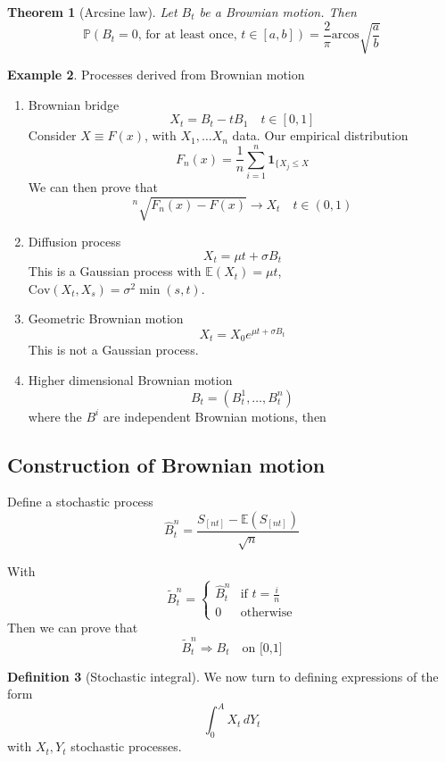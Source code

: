 \documentclass[10pt, oneside, reqno]{amsart}
\theoremstyle{plain}%
\newtheorem{thm}{Theorem}[section]
\theoremstyle{definition}
\newtheorem{defn}[thm]{Definition}
\newtheorem{exmp}[thm]{Example}
\theoremstyle{remark}
\renewcommand{\P}{\mathbb{P}}
\newcommand{\E}{\mathbb{E}}
\begin{document}
\begin{thm}[Arcsine law]
    Let $B_t$ be a Brownian motion.  Then \[
        \P(\text{$B_t = 0$, for at least once, $t \in [a,b]$}) = \frac{2}{\pi} \text{arcos} \sqrt{\frac{a}{b}}
    \]
\end{thm}

\begin{exmp}
    Processes derived from Brownian motion
    \begin{enumerate}[(1)]
        \item Brownian bridge
        \[
            X_t = B_t - t B_1 \quad t \in [0,1]
        \]
        Consider $X \equiv F(x)$, with $X_1, \dots X_n$ data.  Our empirical distribution \[
            F_n(x) = \frac{1}{n} \sum_{i=1}^n \mathbf{1}_{\{ X_j \leq X}
        \]
        We can then prove that \[
        {}^n\sqrt{F_n(x) - F(x)} \rightarrow X_t \quad t \in (0,1)
        \] 
        \item Diffusion process\[
            X_t = \mu t + \sigma B_t
        \] This is a Gaussian process with $\E(X_t) = \mu t$, $\text{Cov}(X_t, X_s) = \sigma^2 \min(s,t)$.
        \item Geometric Brownian motion\[
            X_t = X_0 e^{\mu t + \sigma B_t}
        \] This is not a Gaussian process.
        \item Higher dimensional Brownian motion\[
            B_t = ( B^1_t, \dots, B^n_t)
        \] where the $B^{i}$ are independent Brownian motions, then 

    \end{enumerate}
\end{exmp}
    
\subsection{Construction of Brownian motion} %
\label{sub:construction_of_brownian_motion}
Define a stochastic process \[
    \hat B_t^n = \frac{ S_{[nt]} - \E(S_{[nt]})}{\sqrt{n}}
\]

With \[
    \tilde B_t^n = \begin{cases}
        \hat B_t^n &\text{if $t = \frac{i}{n}$} \\
        0           &\text{otherwise}
    \end{cases}
\]
Then we can prove that \[
    \tilde B_t^n \Rightarrow B_t \quad \text{on [0,1]}
\]

\begin{defn}[Stochastic integral]
    We now turn to defining expressions of the form\[
        \int_0^A X_t \, dY_t
    \] with $X_t, Y_t$ stochastic processes.
\end{defn}
\end{document}
